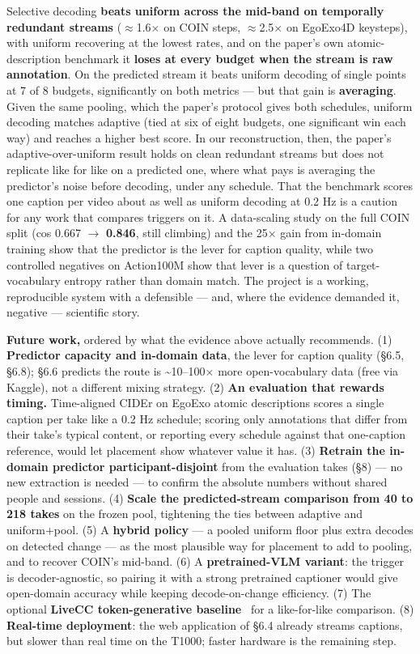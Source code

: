 Selective decoding \textbf{beats uniform across the mid-band on temporally redundant streams} ($\approx$1.6$\times$ on COIN steps, $\approx$2.5$\times$ on EgoExo4D keysteps), with uniform recovering at the lowest rates, and on the paper's own atomic-description benchmark it \textbf{loses at every budget when the stream is raw annotation}. On the predicted stream it beats uniform decoding of single points at 7 of 8 budgets, significantly on both metrics --- but that gain is \textbf{averaging}. Given the same pooling, which the paper's protocol gives both schedules, uniform decoding matches adaptive (tied at six of eight budgets, one significant win each way) and reaches a higher best score. In our reconstruction, then, the paper's adaptive-over-uniform result holds on clean redundant streams but does not replicate like for like on a predicted one, where what pays is averaging the predictor's noise before decoding, under any schedule. That the benchmark scores one caption per video about as well as uniform decoding at 0.2 Hz is a caution for any work that compares triggers on it. A data-scaling study on the full COIN split (cos 0.667 $\rightarrow$ \textbf{0.846}, still climbing) and the 25$\times$ gain from in-domain training show that the predictor is the lever for caption quality, while two controlled negatives on Action100M show that lever is a question of target-vocabulary entropy rather than domain match. The project is a working, reproducible system with a defensible --- and, where the evidence demanded it, negative --- scientific story.

\textbf{Future work,} ordered by what the evidence above actually recommends. (1) \textbf{Predictor capacity and in-domain data}, the lever for caption quality (\S6.5, \S6.8); \S6.6 predicts the route is \textasciitilde{}10--100$\times$ more open-vocabulary data (free via Kaggle), not a different mixing strategy. (2) \textbf{An evaluation that rewards timing.} Time-aligned CIDEr on EgoExo atomic descriptions scores a single caption per take like a 0.2 Hz schedule; scoring only annotations that differ from their take's typical content, or reporting every schedule against that one-caption reference, would let placement show whatever value it has. (3) \textbf{Retrain the in-domain predictor participant-disjoint} from the evaluation takes (\S8) --- no new extraction is needed --- to confirm the absolute numbers without shared people and sessions. (4) \textbf{Scale the predicted-stream comparison from 40 to 218 takes} on the frozen pool, tightening the ties between adaptive and uniform+pool. (5) A \textbf{hybrid policy} --- a pooled uniform floor plus extra decodes on detected change --- as the most plausible way for placement to add to pooling, and to recover COIN's mid-band. (6) A \textbf{pretrained-VLM variant}: the trigger is decoder-agnostic, so pairing it with a strong pretrained captioner would give open-domain accuracy while keeping decode-on-change efficiency. (7) The optional \textbf{LiveCC token-generative baseline}~\cite{livecc2025} for a like-for-like comparison. (8) \textbf{Real-time deployment}: the web application of \S6.4 already streams captions, but slower than real time on the T1000; faster hardware is the remaining step.

